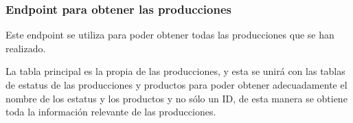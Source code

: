 \subsubsection{Endpoint para obtener las producciones}
Este endpoint se utiliza para poder obtener todas las producciones que se han realizado.

La tabla principal es la propia de las producciones, y esta se unirá con las tablas de estatus de las producciones y productos para poder obtener adecuadamente el nombre de los estatus y los productos y no sólo un ID, de esta manera se obtiene toda la información relevante de las producciones.